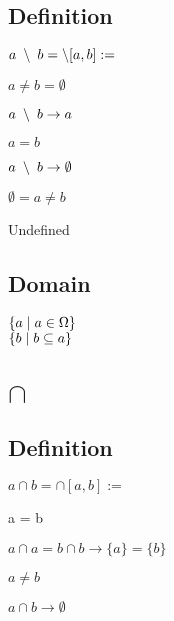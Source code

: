 \documentclass[11pt]{article}
\begin{document}
\subsection{Definition}
\vspace{1mm}
\begin{center}
$
a \hspace{1mm} \setminus \hspace{1mm}  b = \setminus[a,b] := 
$
\end{center}
$a \neq b = \emptyset$
\begin{center}
$
a \hspace{1mm} \setminus \hspace{1mm} b \rightarrow a
$
\end{center}
\vspace{2mm}
$a = b$
\begin{center}
$
a \hspace{1mm} \setminus \hspace{1mm} b \rightarrow \emptyset
$
\end{center}
\vspace{2mm}
$\emptyset = a \neq b$
\begin{center}
Undefined
\end{center}
\subsection{Domain}
\begin{center}
$
\{ a \hspace{1mm} | \hspace{1mm} a \in \Omega\}
$
\\ \vspace{2mm}
$
\{ b \hspace{1mm}|\hspace{1mm} b \subseteq a\}
$
\end{center}






\newpage
\section{$\cap$}
\subsection{Definition}
\begin{center}
$
a \cap b = \cap[a,b] :=
$
\end{center}
\vspace{2mm}
a = b
\begin{center}
$
a \cap a = b \cap b \rightarrow \{a\} = \{b\}
$
\end{center}
\vspace{2mm}
$a \neq b$
\begin{center}
$
a \cap b \rightarrow \emptyset
$
\end{center}
\end{document}
